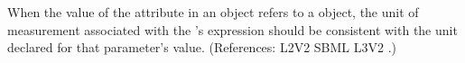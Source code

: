 When the value of the attribute  in an \InitialAssignment
object refers to a \Parameter object, the unit of measurement associated
with the \InitialAssignment's  expression should be consistent
with the unit declared for that parameter's value.  (References: L2V2 SBML
L3V2 .)
